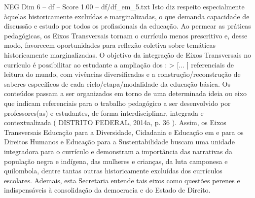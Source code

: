 \begin{textsample}{NEG Dim 6 – df – Score 1.00 – df/df\_em\_5.txt}
Isto diz respeito especialmente àquelas historicamente excluídas e marginalizadas, o que demanda capacidade de discussão e estudo por todos os profissionais da educação.
Ao permear as práticas pedagógicas, os Eixos Transversais tornam o currículo menos prescritivo e, desse modo, favorecem oportunidades para reflexão coletiva sobre temáticas historicamente marginalizadas.
O objetivo da integração de Eixos Transversais no currículo é possibilitar ao estudante a ampliação dos : > [... ] referenciais de leitura do mundo, com vivências diversificadas e a construção/reconstrução de saberes específicos de cada ciclo/etapa/modalidade da educação básica.
Os conteúdos passam a ser organizados em torno de uma determinada ideia ou eixo que indicam referenciais para o trabalho pedagógico a ser desenvolvido por professores(as) e estudantes, de forma interdisciplinar, integrada e contextualizada ( DISTRITO FEDERAL, 2014a, p. 36 ).
Assim, os Eixos Transversais Educação para a Diversidade, Cidadania e Educação em e para os Direitos Humanos e Educação para a Sustentabilidade buscam uma unidade integradora para o currículo e demonstram a importância das narrativas da população negra e indígena, das mulheres e crianças, da luta camponesa e quilombola, dentre tantas outras historicamente excluídas dos currículos escolares.
Ademais, esta Secretaria entende tais eixos como questões perenes e indispensáveis à consolidação da democracia e do Estado de Direito.

\end{textsample}
